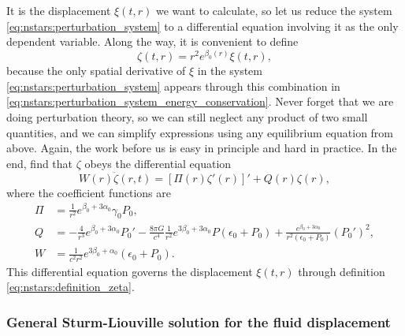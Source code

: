 It is the displacement $\xi(t,r)$ we want to calculate, so let us reduce the system \eqref{eq:nstars:perturbation_system} to a differential equation involving it as the only dependent variable.
Along the way, it is convenient to define
\begin{equation}
	\zeta(t,r) = r^2 e^{\beta_0(r)} \xi(t,r),
\label{eq:nstars:definition_zeta}
\end{equation}
because the only spatial derivative of $\xi$ in the system \eqref{eq:nstars:perturbation_system} appears through this combination in \cref{eq:nstars:perturbation_system_energy_conservation}.
Never forget that we are doing perturbation theory, so we can still neglect any product of two small quantities, and we can simplify expressions using any equilibrium equation from above.
Again, the work before us is easy in principle and hard in practice.
In the end, \cite[equation 26.19]{ref:mtw} find that $\zeta$ obeys the differential equation
\begin{equation}
	W(r) \ddot{\zeta}(r,t) = \left[ \Pi(r) \zeta'(r) \right]' + Q(r) \zeta(r) ,
\label{eq:nstars:diffeq_zeta}
\end{equation}
where the coefficient functions are
\begin{subequations}
\begin{align}
	\Pi &= \frac{1}{r^2} e^{\beta_0 + 3 \alpha_0} \gamma_0 P_0 , \label{eq:nstars:sturm_liouville_coefficients_Pi} \\
	Q   &= -\frac{4}{r^3} e^{\beta_0 + 3 \alpha_0} P_0' - \frac{8 \pi G}{c^4} \frac{1}{r^2} e^{3 \beta_0 + 3 \alpha_0} P (\epsilon_0 + P_0) + \frac{e^{\beta_0 + 3 \alpha_0}}{r^2(\epsilon_0 + P_0)} \left( P_0' \right)^2 , \label{eq:nstars:sturm_liouville_coefficients_Q} \\
	W   &= \frac{1}{c^2 r^2} e^{3 \beta_0 + \alpha_0} (\epsilon_0 + P_0) . \label{eq:nstars:sturm_liouville_coefficients_W}
\end{align}
\label{eq:nstars:sturm_liouville_coefficients}
\end{subequations}
This differential equation governs the displacement $\xi(t,r)$ through definition \eqref{eq:nstars:definition_zeta}.

\subsubsection{General Sturm-Liouville solution for the fluid displacement}

